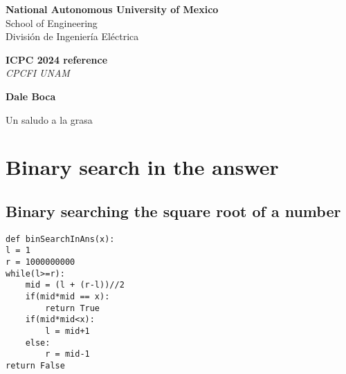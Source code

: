 \documentclass{article}
\begin{document}
\begin{titlepage}
    \begin{center}
        
        \Large\textbf{National Autonomous University of Mexico} \\
        \Large{School of Engineering} \\
        \Large{División de Ingeniería Eléctrica}
        
        \vspace*{5cm}
        
        \Huge\textbf{ICPC 2024 reference}\\[0.5cm]
        
        \Large\textit{CPCFI UNAM}
        
        \vspace{4cm}
        
        \Huge \textbf{Dale Boca}
        
        \vspace{2cm}
        \Large Un saludo a la grasa
    

    \end{center}
\end{titlepage}


\section{Binary search in the answer}
\subsection{Binary searching the square root of a number}
\begin{lstlisting}
def binSearchInAns(x):
l = 1
r = 1000000000
while(l>=r):
    mid = (l + (r-l))//2
    if(mid*mid == x):
        return True
    if(mid*mid<x):
        l = mid+1
    else:
        r = mid-1
return False
\end{lstlisting}
\end{document}
